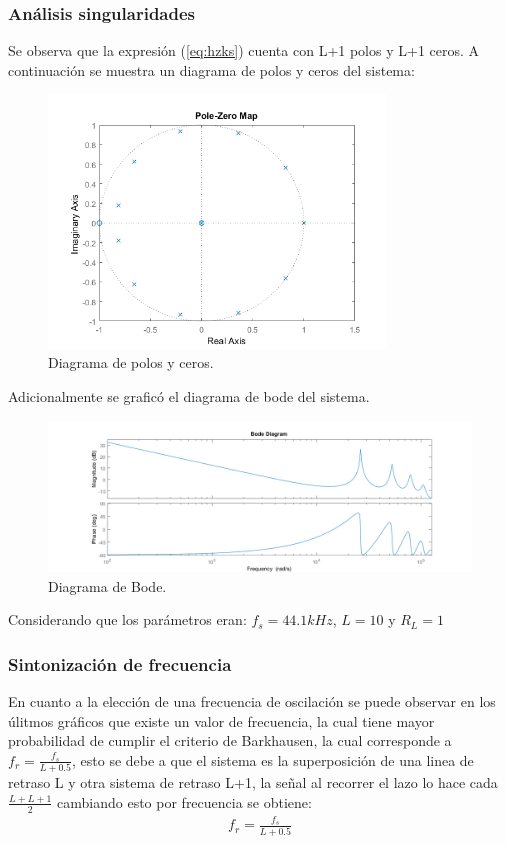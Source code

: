 \subsubsection{Análisis singularidades}
Se observa que la expresión (\ref{eq:hzks}) cuenta con L+1 polos y L+1 ceros. A continuación se muestra un diagrama de polos y ceros del sistema:
\begin{figure}[H]
	\centering
	\includegraphics[width=0.8\textwidth]{ImagenesEjercicio4/pzks.PNG}
\caption{Diagrama de polos y ceros.}
	\label{fig:zpdig}
\end{figure}
Adicionalmente se graficó el diagrama de bode del sistema.
\begin{figure}[H]
	\centering
	\includegraphics[width=\textwidth]{ImagenesEjercicio4/bodeks.PNG}
\caption{Diagrama de Bode.}

	\label{fig:bode}
\end{figure}
Considerando que los parámetros eran: $f_s = 44.1kHz$, $L=10$ y $R_L=1$
\subsubsection{Sintonización de frecuencia}
En cuanto a la elección de una frecuencia de oscilación se puede observar en los úlitmos gráficos que existe un valor de frecuencia, la cual tiene mayor probabilidad de cumplir el criterio de Barkhausen, la cual corresponde a $f_r = \frac{f_s}{L+0.5}$, esto se debe a que el sistema es la superposición de una linea de retraso  L y otra sistema de retraso L+1, la señal al recorrer el lazo lo hace cada $\frac{L+L+1}{2}$ cambiando esto por frecuencia se obtiene:
\begin{align}
f_r=\frac{f_s}{L+0.5}
\label{eq:fr}
\end{align}
